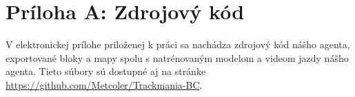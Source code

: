 \chapter*{Príloha A: Zdrojový kód}

V elektronickej prílohe priloženej k práci sa nachádza zdrojový kód nášho agenta, exportované bloky a mapy spolu s natrénovaným modelom a videom jazdy nášho agenta. Tieto súbory sú dostupné aj na stránke \url{https://github.com/Metcoler/Trackmania-BC}.
